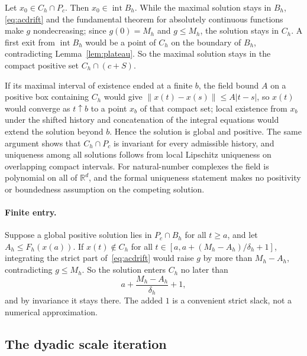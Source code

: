 \documentclass[11pt]{article}
\theoremstyle{definition}
\theoremstyle{remark}
\newcommand{\R}{\mathbb R}
\newcommand{\norm}[1]{\left\|#1\right\|}
\DeclareMathOperator{\interior}{int}
\begin{document}
Let $x_0\in C_h\cap P_c$. Then $x_0\in\interior B_h$. While the maximal solution
stays in $B_h$, \eqref{eq:acdrift} and the fundamental theorem for absolutely
continuous functions make $g$ nondecreasing; since $g(0)=M_h$ and $g\le M_h$, the
solution stays in $C_h$. A first exit from $\interior B_h$ would be a point of
$C_h$ on the boundary of $B_h$, contradicting Lemma~\ref{lem:plateau}. So the
maximal solution stays in the compact positive set $C_h\cap(c+S)$.

If its maximal interval of existence ended at a finite $b$, the field bound $A$ on
a positive box containing $C_h$ would give $\norm{x(t)-x(s)}\le A|t-s|$, so $x(t)$
would converge as $t\uparrow b$ to a point $x_b$ of that compact set; local
existence from $x_b$ under the shifted history and concatenation of the integral
equations would extend the solution beyond $b$. Hence the solution is global and
positive. The same argument shows that $C_h\cap P_c$ is invariant for every
admissible history, and uniqueness among all solutions follows from local
Lipschitz uniqueness on overlapping compact intervals. For natural-number
complexes the field is polynomial on all of $\R^d$, and the formal uniqueness
statement makes no positivity or boundedness assumption on the competing solution.

\paragraph{Finite entry.}
Suppose a global positive solution lies in $P_c\cap B_h$ for all $t\ge a$, and let
$A_h\le F_h(x(a))$. If $x(t)\notin C_h$ for all $t\in[a,a+(M_h-A_h)/\delta_h+1]$,
integrating the strict part of~\eqref{eq:acdrift} would raise $g$ by more than
$M_h-A_h$, contradicting $g\le M_h$. So the solution enters $C_h$ no later than
\begin{equation}\label{eq:delay}
 a+\frac{M_h-A_h}{\delta_h}+1,
\end{equation}
and by invariance it stays there. The added $1$ is a convenient strict slack, not
a numerical approximation.

\subsection{The dyadic scale iteration}\label{sec:iteration}
\end{document}
